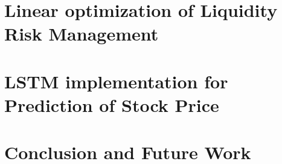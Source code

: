 \documentclass[a4paper,12pt,oneside]{book}
\theoremstyle{plain}
\begin{document}
	\chapter{Linear optimization of Liquidity Risk Management}
	
	
	\chapter{LSTM implementation for Prediction of Stock Price}
	
	
	\chapter{Conclusion and Future Work}
	
	
	
\end{document}
